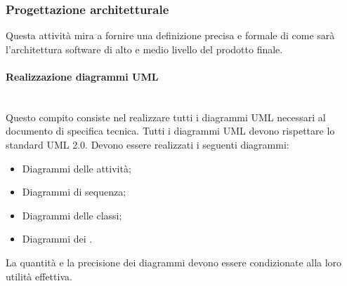 \subsubsection{Progettazione architetturale}
\label{prog_arch}
Questa attivit\`{a} mira a fornire una definizione precisa e formale di come sarà l'architettura software di alto e medio livello del prodotto finale.


\paragraph{Realizzazione diagrammi UML} \hfill \\
Questo compito consiste nel realizzare tutti i diagrammi UML necessari al documento di specifica tecnica.
Tutti i diagrammi UML devono rispettare lo standard UML 2.0.
Devono essere realizzati i seguenti diagrammi:
\begin{itemize}
\item Diagrammi delle attivit\`{a};
\item Diagrammi di sequenza;
\item Diagrammi delle classi;
\item Diagrammi dei .
\end{itemize}

La quantità e la precisione dei diagrammi devono essere condizionate alla loro utilità effettiva.

